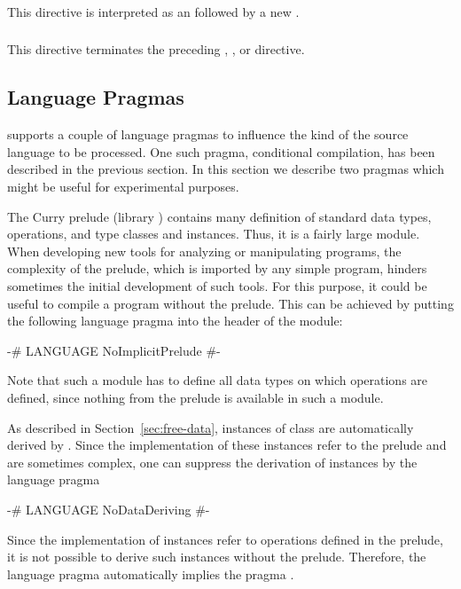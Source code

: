 \subsubsection*{}

This directive is interpreted as an  followed by
a new .

\subsubsection*{}

This directive terminates the preceding
, , or  directive.


\subsection{Language Pragmas}

\CYS supports a couple of language pragmas
to influence the kind of the source language to be processed.
One such pragma, conditional compilation, has been described
in the previous section.
In this section we describe two pragmas which might be useful
for experimental purposes.

The Curry prelude (library ) contains
many definition of standard data types, operations,
and type classes and instances.
Thus, it is a fairly large module.
When developing new tools for analyzing or manipulating programs,
the complexity of the prelude, which is imported by any simple program,
hinders sometimes the initial development of such tools.
For this purpose, it could be useful to compile a program without
the prelude.
This can be achieved by putting the following language pragma
into the  header of the module:
%
\begin{curry}
{-# LANGUAGE NoImplicitPrelude #-}
\end{curry}
%
Note that such a module has to define all data types
on which operations are defined, since nothing from the prelude
is available in such a module.

As described in Section~\ref{sec:free-data},
instances of class  are automatically derived by \CYS.
Since the implementation of these instances refer to the prelude
and are sometimes complex, one can suppress the derivation
of  instances by the language pragma
%
\begin{curry}
{-# LANGUAGE NoDataDeriving #-}
\end{curry}
%
Since the implementation of  instances refer
to operations defined in the prelude, it is not possible
to derive such instances without the prelude.
Therefore, the language pragma 
automatically implies the pragma .

